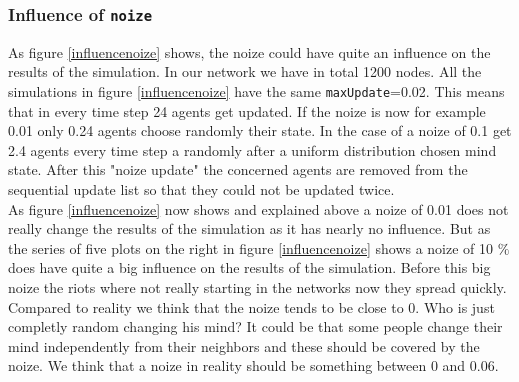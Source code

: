 \subsubsection{Influence of \texttt{noize}}
\label{sec:influencenoize}
As figure \ref{influencenoize} shows, the noize could have quite an influence on the results of the simulation. In our network we have in total 1200 nodes. All the simulations in figure \ref{influencenoize} have the same \texttt{maxUpdate}=0.02. This means that in every time step 24 agents get updated. If the noize is now for example 0.01 only 0.24 agents choose randomly their state. In the case of a noize of 0.1 get 2.4 agents every time step a randomly after a uniform distribution chosen mind state. After this "noize update" the concerned agents are removed from the sequential update list so that they could not be updated twice.\\
As figure \ref{influencenoize} now shows and explained above a noize of 0.01 does not really change the results of the simulation as it has nearly no influence. But as the series of five plots on the right in figure \ref{influencenoize} shows a noize of 10 $\%$ does have quite a big influence on the results of the simulation. Before this big noize the riots where not really starting in the networks now they spread quickly.\\
Compared to reality we think that the noize tends to be close to 0. Who is just completly random changing his mind? It could be that some people change their mind independently from their neighbors and these should be covered by the noize. We think that a noize in reality should be something between 0 and 0.06.

